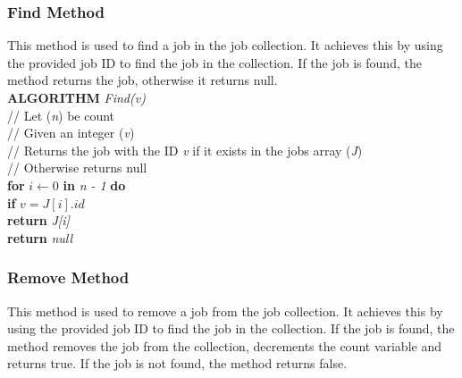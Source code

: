 \documentclass[12pt,a4paper]{article}
\begin{document}
			\newpage

			\subsubsection{Find Method}
				This method is used to find a job in the job collection. It achieves this by using the provided 
				job ID to find the job in the collection. If the job is found, the method returns the job, 
				otherwise it returns null.\\

				\textbf{ALGORITHM} \textit{Find(v)}\\
				\null\qquad\quad// Let (\textit{n}) be count\\
				\null\qquad\quad// Given an integer (\textit{v})\\
				\null\qquad\quad// Returns the job with the ID \textit{v} if it exists in the jobs array (\textit{J})\\
				\null\qquad\quad// Otherwise returns null\\
				\null\qquad\quad\textbf{for} \textit{$i \gets 0$} \textbf{in} \textit{n - 1} \textbf{do}\\
				\null\qquad\qquad\textbf{if} \textit{$v = J[i].id$}\\
				\null\qquad\qquad\quad\textbf{return} \textit{J[i]}\\
				\null\qquad\quad\textbf{return} \textit{null}\\

			\subsubsection{Remove Method}
				This method is used to remove a job from the job collection. It achieves this by using the 
				provided job ID to find the job in the collection. If the job is found, the method removes the 
				job from the collection, decrements the count variable and returns true. If the job is not found, 
				the method returns false.\\
\end{document}
